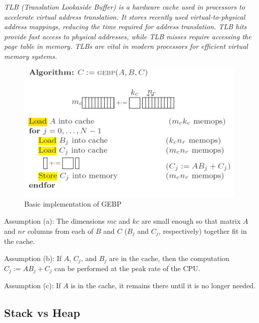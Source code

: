 \textit{TLB (Translation Lookaside Buffer) is a hardware cache used in processors to accelerate virtual address translation. It stores recently used virtual-to-physical address mappings, reducing the time required for address translation. TLB hits provide fast access to physical addresses, while TLB misses require accessing the page table in memory. TLBs are vital in modern processors for efficient virtual memory systems.}


\begin{figure}[H]
\centering
\includegraphics[width=110mm]{Figures/Imagenes/GEBP.png}
\caption{Basic implementation of GEBP}
\end{figure}


Assumption (a): The dimensions $mc$ and $kc$ are small enough so that matrix $A$ and $nr$ columns from each of $B$ and $C$ ($B_j$ and $C_j$, respectively) together fit in the cache.

Assumption (b): If $A$, $C_j$, and $B_j$ are in the cache, then the computation $C_j := AB_j + C_j$ can be performed at the peak rate of the CPU.

Assumption (c): If $A$ is in the cache, it remains there until it is no longer needed.


\clearpage

\subsection{Stack vs Heap}

